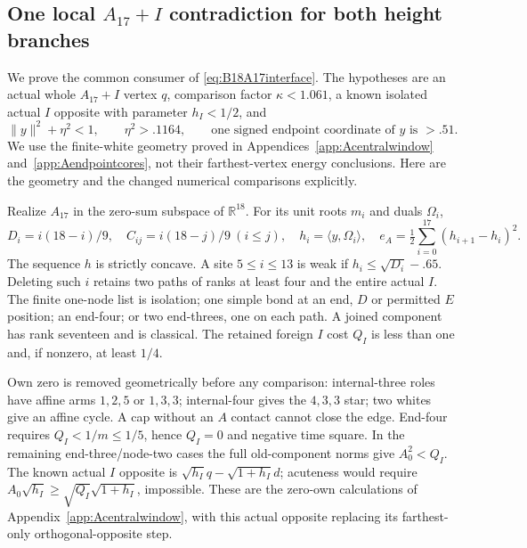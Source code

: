 \documentclass[11pt]{article}
\theoremstyle{definition}
\theoremstyle{remark}
\newcommand{\ip}[2]{\langle #1,#2\rangle}
\newcommand{\norm}[1]{\lVert #1\rVert}
\begin{document}
\subsection[One local A17+I contradiction for both height branches]{One local \(A_{17}+I\) contradiction for both height branches}
\label{app:B18localA17}
We prove the common consumer of \eqref{eq:B18A17interface}.
The hypotheses are an actual whole \(A_{17}+I\) vertex \(q\),
comparison factor \(\kappa<1.061\), a known isolated actual \(I\)
opposite with parameter \(h_I<1/2\), and
\[
 \norm y^2+\eta^2<1,\qquad \eta^2>.1164,\qquad
 \text{one signed endpoint coordinate of \(y\) is }>.51 .
\]
We use the finite-white geometry proved in
Appendices~\ref{app:Acentralwindow} and~\ref{app:Aendpointcores},
not their farthest-vertex energy conclusions.
Here are the geometry and the changed numerical comparisons explicitly.

Realize \(A_{17}\) in the zero-sum subspace of \(\mathbb R^{18}\).
For its unit roots \(m_i\) and duals \(\Omega_i\),
\[
 D_i=i(18-i)/9,\quad C_{ij}=i(18-j)/9\ (i\leq j),\quad
 h_i=\ip y{\Omega_i},\quad
 e_A=\tfrac12\sum_{i=0}^{17}(h_{i+1}-h_i)^2 .
\]
The sequence \(h\) is strictly concave.
A site \(5\leq i\leq13\) is weak if \(h_i\leq\sqrt{D_i}-.65\).
Deleting such \(i\) retains two paths of ranks at least four and
the entire actual \(I\). The finite one-node list is isolation;
one simple bond at an end, \(D\) or permitted \(E\) position;
an end-four; or two end-threes, one on each path.
A joined component has rank seventeen and is classical.
The retained foreign \(I\) cost \(Q_I\) is less than one and,
if nonzero, at least \(1/4\).

Own zero is removed geometrically before any comparison:
internal-three roles have affine arms \(1,2,5\) or \(1,3,3\);
internal-four gives the \(4,3,3\) star; two whites give an affine
cycle. A cap without an \(A\) contact cannot close the edge.
End-four requires \(Q_I<1/m\leq1/5\), hence \(Q_I=0\) and
negative time square. In the remaining end-three/node-two cases
the full old-component norms give \(A_0^2<Q_I\).
The known actual \(I\) opposite is
\(\sqrt{h_I}q-\sqrt{1+h_I}d\); acuteness would require
\(A_0\sqrt{h_I}\geq\sqrt{Q_I}\sqrt{1+h_I}\), impossible.
These are the zero-own calculations of
Appendix~\ref{app:Acentralwindow}, with this actual opposite
replacing its farthest-only orthogonal-opposite step.
\end{document}
